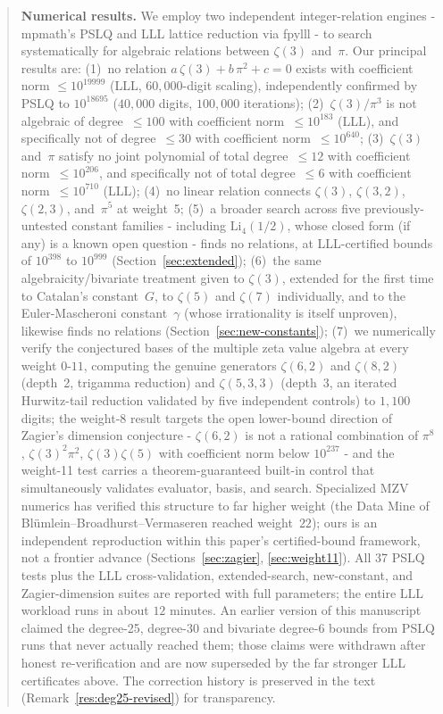 \documentclass[12pt]{article}
\theoremstyle{definition}
\theoremstyle{remark}
\begin{document}
\begin{abstract}
\textbf{Numerical results.}  We employ two independent
integer-relation engines - mpmath's PSLQ and LLL lattice reduction via
fpylll - to search systematically for algebraic relations between
$\zeta(3)$ and~$\pi$.
Our principal results are:
(1)~no relation $a\,\zeta(3) + b\,\pi^2 + c = 0$ exists with
coefficient norm $\le 10^{19999}$ (LLL, $60{,}000$-digit scaling),
independently confirmed by PSLQ to $10^{18695}$ ($40{,}000$ digits,
$100{,}000$ iterations);
(2)~$\zeta(3)/\pi^3$ is not algebraic of degree~$\le 100$ with
coefficient norm~$\le 10^{183}$ (LLL), and specifically not of
degree~$\le 30$ with coefficient norm~$\le 10^{640}$;
(3)~$\zeta(3)$ and~$\pi$ satisfy no joint polynomial of total
degree~$\le 12$ with coefficient norm~$\le 10^{206}$, and specifically
not of total degree~$\le 6$ with coefficient norm~$\le 10^{710}$
(LLL);
(4)~no linear relation connects $\zeta(3)$, $\zeta(3,2)$, $\zeta(2,3)$,
and~$\pi^5$ at weight~5;
(5)~a broader search across five previously-untested constant
families - including $\mathrm{Li}_4(1/2)$, whose closed form (if any)
is a known open question - finds no relations, at LLL-certified
bounds of $10^{398}$ to $10^{999}$
(Section~\ref{sec:extended});
(6)~the same algebraicity/bivariate treatment given to $\zeta(3)$,
extended for the first time to Catalan's constant~$G$, to $\zeta(5)$
and $\zeta(7)$ individually, and to the Euler-Mascheroni
constant~$\gamma$ (whose irrationality is itself unproven), likewise
finds no relations (Section~\ref{sec:new-constants});
(7)~we numerically verify the conjectured bases of the multiple zeta
value algebra at every weight $0$-$11$, computing the genuine
generators $\zeta(6,2)$ and $\zeta(8,2)$ (depth~2, trigamma
reduction) and $\zeta(5,3,3)$ (depth~3, an iterated Hurwitz-tail
reduction validated by five independent controls) to $1{,}100$
digits; the weight-8 result targets the open lower-bound direction of
Zagier's dimension conjecture - $\zeta(6,2)$ is not a rational
combination of $\pi^8$, $\zeta(3)^2\pi^2$, $\zeta(3)\zeta(5)$ with
coefficient norm below $10^{237}$ - and the weight-11 test carries a
theorem-guaranteed built-in control that simultaneously validates
evaluator, basis, and search.  Specialized MZV numerics has verified
this structure to far higher weight (the Data Mine of
Bl\"umlein--Broadhurst--Vermaseren reached weight~$22$); ours is an
independent reproduction within this paper's certified-bound
framework, not a frontier advance
(Sections~\ref{sec:zagier}, \ref{sec:weight11}).
All 37 PSLQ tests plus the LLL cross-validation, extended-search,
new-constant, and Zagier-dimension suites are reported with full
parameters; the entire LLL workload runs in about $12$ minutes.
An earlier version of this manuscript claimed the degree-25, degree-30
and bivariate degree-6 bounds from PSLQ runs that never actually
reached them; those claims were withdrawn after honest re-verification
and are now superseded by the far stronger LLL certificates above.
The correction history is preserved in the text
(Remark~\ref{res:deg25-revised}) for transparency.
\end{abstract}
\end{document}
